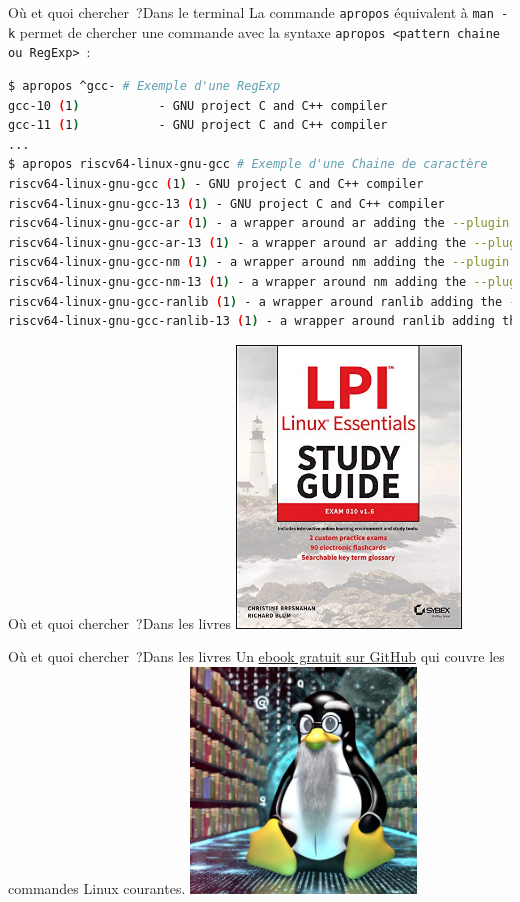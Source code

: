 \documentclass{beamer}
\begin{document}
    \begin{frame}[fragile]{Où et quoi chercher~?}{Dans le terminal}
        La commande \lstinline{apropos} équivalent à \lstinline{man -k} permet de chercher une commande avec la syntaxe \lstinline{apropos <pattern chaine ou RegExp>}~:
        \begin{lstlisting}[language=bash]
$ apropos ^gcc- # Exemple d'une RegExp
gcc-10 (1)           - GNU project C and C++ compiler
gcc-11 (1)           - GNU project C and C++ compiler
...
$ apropos riscv64-linux-gnu-gcc # Exemple d'une Chaine de caractère
riscv64-linux-gnu-gcc (1) - GNU project C and C++ compiler
riscv64-linux-gnu-gcc-13 (1) - GNU project C and C++ compiler
riscv64-linux-gnu-gcc-ar (1) - a wrapper around ar adding the --plugin option
riscv64-linux-gnu-gcc-ar-13 (1) - a wrapper around ar adding the --plugin option
riscv64-linux-gnu-gcc-nm (1) - a wrapper around nm adding the --plugin option
riscv64-linux-gnu-gcc-nm-13 (1) - a wrapper around nm adding the --plugin option
riscv64-linux-gnu-gcc-ranlib (1) - a wrapper around ranlib adding the --plugin option
riscv64-linux-gnu-gcc-ranlib-13 (1) - a wrapper around ranlib adding the --plugin option
        \end{lstlisting}
    \end{frame}

    \begin{frame}{Où et quoi chercher~?}{Dans les livres}
        \centering
        \includegraphics[width=6cm]{image/lpi-book}
    \end{frame}

    \begin{frame}{Où et quoi chercher~?}{Dans les livres}
        Un \href{https://github.com/bobbyiliev/101-linux-commands-ebook?tab=readme-ov-file}{ebook gratuit sur GitHub} qui couvre les commandes Linux courantes.
        \bigbreak
        \centering
        \includegraphics[width=6cm]{image/wise-tux}
    \end{frame}
\end{document}
